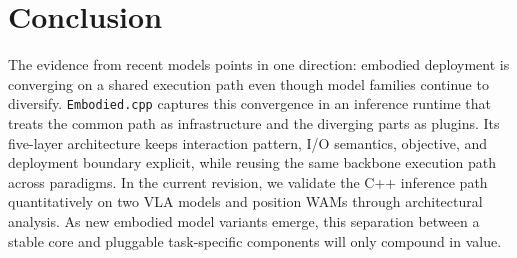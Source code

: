 \documentclass[11pt,letterpaper,logo]{seu-paisys}
\newcommand{\system}{\texttt{Embodied.cpp}\xspace}
\begin{document}
%
%





\section{Conclusion}

The evidence from recent models points in one direction: embodied deployment is converging on a shared execution path even though model families continue to diversify. \system captures this convergence in an inference runtime that treats the common path as infrastructure and the diverging parts as plugins. Its five-layer architecture keeps interaction pattern, I/O semantics, objective, and deployment boundary explicit, while reusing the same backbone execution path across paradigms. In the current revision, we validate the C++ inference path quantitatively on two VLA models and position WAMs through architectural analysis. As new embodied model variants emerge, this separation between a stable core and pluggable task-specific components will only compound in value.



\end{document}
